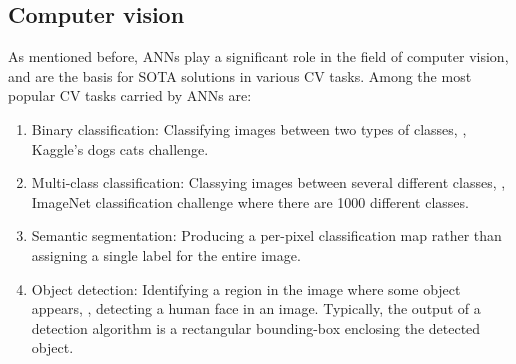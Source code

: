 \subsection{Computer vision}
As mentioned before, ANNs play a significant role in the field of computer vision, and are the basis for SOTA solutions in various CV tasks.
Among the most popular CV tasks carried by ANNs are:
\begin{enumerate}
    \item Binary classification: Classifying images between two types of classes, \eg, Kaggle's dogs \vs cats challenge.
    \item Multi-class classification: Classying images between several different classes, \eg, ImageNet classification challenge where there are 1000 different classes.
    \item Semantic segmentation: Producing a per-pixel classification map rather than assigning a single label for the entire image.
    \item Object detection: Identifying a region in the image where some object appears, \eg, detecting a human face in an image. 
    Typically, the output of a detection algorithm is a rectangular bounding-box enclosing the detected object.
\end{enumerate}

